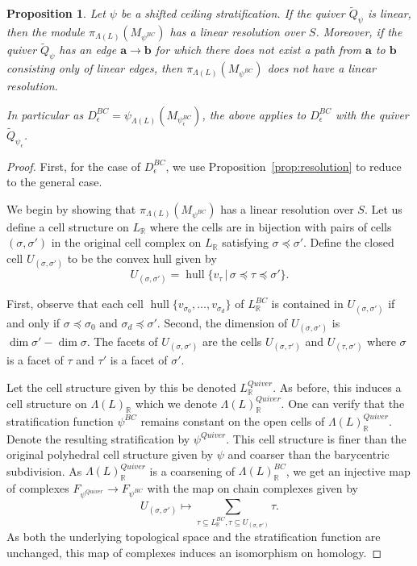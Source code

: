 \documentclass{amsart}
\newcommand{\RR}{\mathbb{R}}
\newcommand{\Mepsilon}{D^{BC}_{\epsilon}}
\DeclareMathOperator{\hull}{hull}
\newtheorem{proposition}[theorem]{Proposition}
\theoremstyle{remark}
\begin{document}
\begin{proposition}
  \label{prop:linear}
  Let $\psi$ be a shifted ceiling stratification.
  If the quiver $\widetilde{Q}_\psi$ is linear, then the module $\pi_{\Lambda(L)}(M_{\psi^{BC}})$ has a linear resolution over $S$.
  Moreover, if the quiver $\widetilde{Q}_\psi$ has an edge $\bm{a}\rightarrow \bm{b}$ for which there does not exist a path from $\bm{a}$ to $\bm{b}$ consisting only of linear edges, then $\pi_{\Lambda(L)}(M_{\psi^{BC}})$ does not have a linear resolution.

  In particular as $\Mepsilon=\psi_{\Lambda(L)}(M_{\psi_{\epsilon}^{BC}})$, the above applies to $\Mepsilon$ with the quiver $\widetilde{Q}_{\psi_\epsilon}$.
\end{proposition}
\begin{proof}
  First, for the case of $\Mepsilon$, we use Proposition~\ref{prop:resolution} to reduce to the general case.
  
  We begin by showing that $\pi_{\Lambda(L)}(M_{\psi^{BC}})$ has a linear resolution over $S$. Let us define a cell structure on $L_{\RR}$ where the cells are in bijection with pairs of cells $(\sigma,\sigma')$ in the original cell complex on $L_{\RR}$ satisfying $\sigma\preceq \sigma'$. Define the closed cell $U_{(\sigma,\sigma')}$ to be the convex hull given by
  \[U_{(\sigma,\sigma')} = \hull\{v_\tau \,|\, \sigma\preceq \tau \preceq \sigma'\}.\]

  First, observe that each cell $\hull\{v_{\sigma_0},\ldots,v_{\sigma_d}\}$ of $L_{\RR}^{BC}$ is contained in $U_{(\sigma,\sigma')}$ if and only if $\sigma\preceq \sigma_0$ and $\sigma_d\preceq \sigma'$. Second, the dimension of $U_{(\sigma,\sigma')}$ is $\dim \sigma' - \dim \sigma$. The facets of $U_{(\sigma,\sigma')}$ are the cells $U_{(\sigma,\tau')}$ and $U_{(\tau,\sigma')}$ where $\sigma$ is a facet of $\tau$ and $\tau'$ is a facet of $\sigma'$.

  Let the cell structure given by this be denoted $L_{\RR}^{Quiver}$. As before, this induces a cell structure on $\Lambda(L)_{\RR}$ which we denote $\Lambda(L)_{\RR}^{Quiver}$. One can verify that the stratification function $\psi^{BC}$ remains constant on the open cells of $\Lambda(L)_{\RR}^{Quiver}$. Denote the resulting stratification by $\psi^{Quiver}$. This cell structure is finer than the original polyhedral cell structure given by $\psi$ and coarser than the barycentric subdivision. As $\Lambda(L)_{\RR}^{Quiver}$ is a coarsening of $\Lambda(L)_{\RR}^{BC}$, we get an injective map of complexes $F_{\psi^{Quiver}}\rightarrow F_{\psi^{BC}}$ with the map on chain complexes given by
  \[U_{(\sigma,\sigma')} \mapsto \sum_{\tau\subseteq L_{\RR}^{BC}, \tau\subseteq U_{(\sigma,\sigma')}} \tau.\]
  As both the underlying topological space and the stratification function are unchanged, this map of complexes induces an isomorphism on homology.
  

\end{proof}
\end{document}
